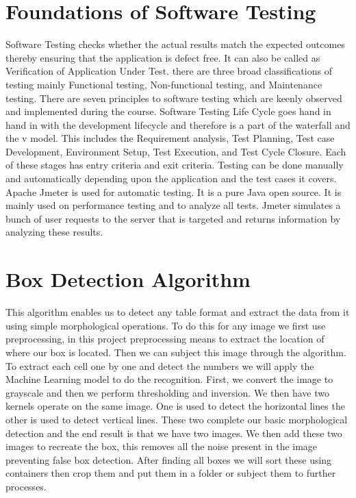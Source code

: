 \documentclass[BTech]{srmuthesis}
\begin{document}
\section{Foundations of Software Testing}
Software Testing checks whether the actual results match the expected outcomes thereby ensuring that the application is defect free. It can also be called as Verification of Application Under Test. there are three broad classifications of testing mainly Functional testing, Non-functional testing, and Maintenance testing. There are seven principles to software testing which are keenly observed and implemented during the course. Software Testing Life Cycle goes hand in hand in with the development lifecycle and therefore is a part of the waterfall and the v model. This includes the Requirement analysis, Test Planning, Test case Development, Environment Setup, Test Execution, and Test Cycle Closure. Each of these stages has entry criteria and exit criteria. Testing can be done manually and automatically depending upon the application and the test cases it covers. Apache Jmeter is used for automatic testing. It is a pure Java open source. It is mainly used on performance testing and to analyze all tests. Jmeter simulates a bunch of user requests to the server that is targeted and returns information by analyzing these results.
\section{Box Detection Algorithm}
This algorithm enables us to detect any table format and extract the data from it using simple morphological operations. To do this for any image we first use preprocessing, in this project preprocessing means to extract the location of where our box is located. Then we can subject this image through the algorithm. To extract each cell one by one and detect the numbers we will apply the Machine Learning model to do the recognition. First, we convert the image to grayscale and then we perform thresholding and inversion. We then have two kernels operate on the same image. One is used to detect the horizontal lines the other is used to detect vertical lines. These two complete our basic morphological detection and the end result is that we have two images. We then add these two images to recreate the box, this removes all the noise present in the image preventing false box detection. After finding all boxes we will sort these using containers then crop them and put them in a folder or subject them to further processes. \cite{boxdetectionalgo}
\end{document}
